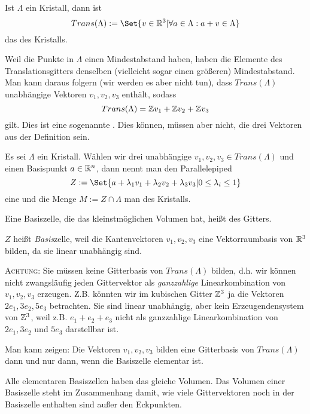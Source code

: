 \begin{definition}
Ist $\Lambda$ ein Kristall, dann ist
\[Trans(\Lambda) := \Set{v\in\IR^3 | \forall a\in\Lambda: a+v\in\Lambda}\]
das  des Kristalls.
\end{definition}

\begin{remark}
Weil die Punkte in $\Lambda$ einen Mindestabstand haben, haben die Elemente des Translationsgitters denselben (vielleicht sogar einen größeren) Mindestabstand. Man kann daraus folgern (wir werden es aber nicht tun), dass $Trans(\Lambda)$ unabhängige Vektoren $v_1,v_2,v_3$ enthält, sodass
\[Trans(\Lambda) = \mathbb{Z} v_1+\mathbb{Z} v_2+\mathbb{Z} v_3\]
gilt. Dies ist eine sogenannte . Dies können, müssen aber nicht, die drei Vektoren aus der Definition sein.
\end{remark}

\begin{definition}
Es sei $\Lambda$ ein Kristall. Wählen wir drei unabhängige $v_1,v_2,v_3\in Trans(\Lambda)$ und einen Basispunkt $a\in\mathbb{R}^n$, dann nennt man den Parallelepiped
\[Z:=\Set{a+\lambda_1 v_1 + \lambda_2 v_2 + \lambda_3 v_3 | 0\leq \lambda_i \leq 1}\]
eine  und die Menge $M:=Z\cap\Lambda$ man  des Kristalls.

Eine Basiszelle, die das kleinstmöglichen Volumen hat, heißt  des Gitters.
\end{definition}

\begin{remark}
$Z$ heißt \emph{Basis}zelle, weil die Kantenvektoren $v_1,v_2,v_3$ eine Vektorraumbasis von $\mathbb{R}^3$ bilden, da sie linear unabhängig sind.

\textsc{Achtung}: Sie müssen keine Gitterbasis von $Trans(\Lambda)$ bilden, d.h. wir können nicht zwangsläufig jeden Gittervektor als \emph{ganzzahlige} Linearkombination von $v_1,v_2,v_3$ erzeugen. Z.B. könnten wir im kubischen Gitter $\mathbb{Z}^3$ ja die Vektoren $2e_1,3e_2,5e_3$ betrachten. Sie sind linear unabhängig, aber kein Erzeugendensystem von $\mathbb{Z}^3$, weil z.B. $e_1+e_2+e_3$ nicht als ganzzahlige Linearkombination von $2e_1, 3e_2$ und $5e_3$ darstellbar ist.
\end{remark}

\begin{remark}
Man kann zeigen: Die Vektoren $v_1,v_2,v_3$ bilden eine Gitterbasis von $Trans(\Lambda)$ dann und nur dann, wenn die Basiszelle elementar ist.

Alle elementaren Basiszellen haben das gleiche Volumen. Das Volumen einer Basiszelle steht im Zusammenhang damit, wie viele Gittervektoren noch in der Basiszelle enthalten sind außer den Eckpunkten.
\end{remark}

